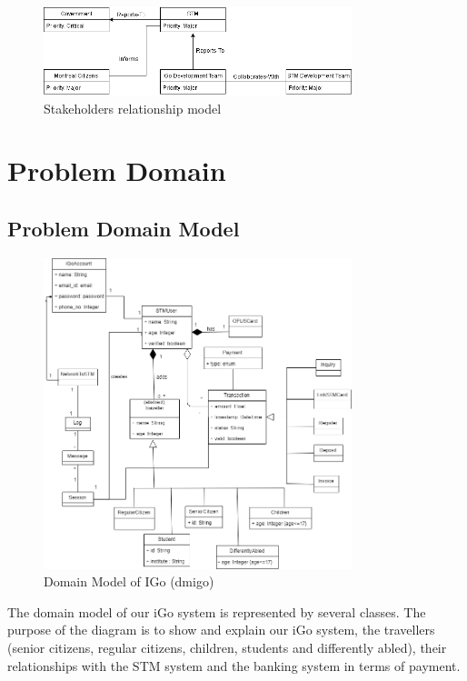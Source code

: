 \documentclass[11pt, english]{article}
\begin{document}
 \begin{figure}[H]
  
  \includegraphics[width=0.8\textwidth]{StakeholderRelationship.png}
  \centering
  \caption{ Stakeholders relationship model}

\end{figure}

\section{Problem Domain}
\subsection{Problem Domain Model}

 \begin{figure}[H]
  
  \includegraphics[width=0.8\textwidth]{domain_model_final.png}
  \centering
  \caption{Domain Model of IGo (\gls{dmigo})}

\end{figure}

The domain model\cite{domainkamthan} of our iGo system is represented by several classes. The purpose of the diagram is to show and explain our iGo system, the travellers (senior citizens, regular citizens, children, students and differently abled), their relationships with the STM system and the banking system in terms of payment. \\
\end{document}

